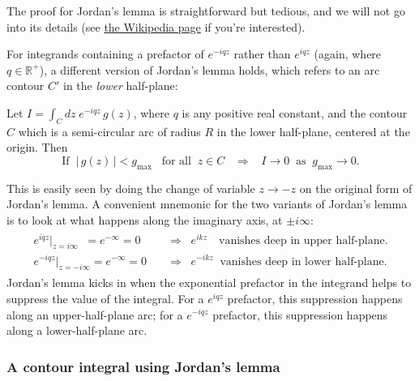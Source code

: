\documentclass[10pt,a4paper]{article}
\begin{document}
The proof for Jordan's lemma is straightforward but tedious, and we
will not go into its details (see
\href{http://en.wikipedia.org/wiki/Jordan\%27s_lemma}{the Wikipedia
  page} if you're interested).

For integrands containing a prefactor of $e^{-iqz}$ rather than
$e^{iqz}$ (again, where $q \in \mathbb{R}^+$), a different version of
Jordan's lemma holds, which refers to an arc contour $C'$ in the
\emph{lower} half-plane:

\begin{framed} \noindent
Let $I = \int_C dz \; e^{-iqz} \,g(z)$, where $q$ is any positive real
constant, and the contour $C$ which is a semi-circular arc of radius
$R$ in the lower half-plane, centered at the origin.  Then
\begin{equation}
  \text{If}\;\; \big|\,g(z)\,\big| < g_{\mathrm{max}} \;\;\;\text{for all}\;\;z \in C \;\;\;\Rightarrow \;\;\; I \rightarrow 0 \;\;\mathrm{as}\;\; g_{\mathrm{max}} \rightarrow 0.
\end{equation}
\end{framed}

This is easily seen by doing the change of variable $z \rightarrow -z$
on the original form of Jordan's lemma. A convenient mnemonic for the
two variants of Jordan's lemma is to look at what happens along the
imaginary axis, at $\pm i\infty$:
\begin{align*}
\begin{aligned} e^{iqz}\big|_{z = i\infty}\;\; = e^{-\infty} = 0\quad &\Rightarrow \;\; e^{ikz} \;\;\;\,\text{vanishes deep in upper half-plane}. \\ e^{-iqz}\big|_{z = -i\infty} = e^{-\infty} = 0\quad &\Rightarrow \;\; e^{-ikz} \;\;\textrm{vanishes deep in lower half-plane}.\end{aligned}
\end{align*}
Jordan's lemma kicks in when the exponential prefactor in the integrand
helps to suppress the value of the integral. For a $e^{iqz}$
prefactor, this suppression happens along an upper-half-plane arc; for a
$e^{-iqz}$ prefactor, this suppression happens along a
lower-half-plane arc.

\subsubsection{A contour integral using Jordan's lemma}
\label{a-contour-integral-using-jordans-lemma}
\end{document}
